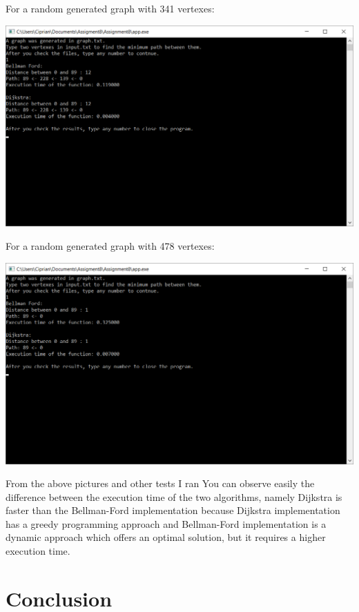 \documentclass[12]{article}
\begin{document}
For a random generated graph with 341 vertexes:

\begin{center}
\includegraphics[scale=0.6]{341.png}
\end{center}

For a random generated graph with 478 vertexes:

\begin{center}
\includegraphics[scale=0.6]{478.png}
\end{center}

From the above pictures and other tests I ran You can observe easily the difference between the execution time of the two algorithms, namely Dijkstra is faster than the Bellman-Ford implementation because Dijkstra implementation has a greedy programming approach and Bellman-Ford implementation is a dynamic approach which offers an optimal solution, but it requires a higher execution time. 

\section{Conclusion}
\textbf{}
\end{document}

